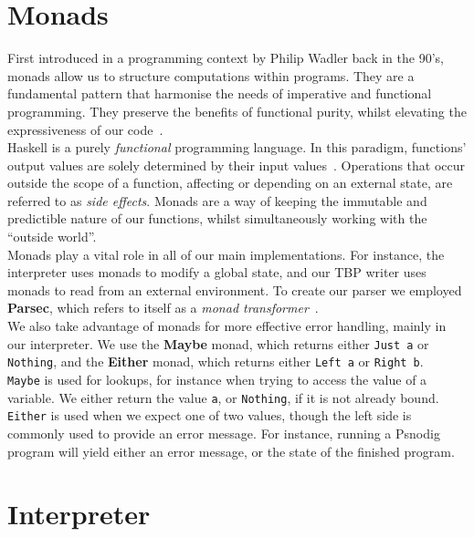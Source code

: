 \section{Monads}

First introduced in a programming context by Philip Wadler back in the 90's, monads allow us to structure computations within programs. They are a fundamental pattern that harmonise the needs of imperative and functional programming. They preserve the benefits of functional purity, whilst elevating the expressiveness of our code~\cite{originOfMonads, leifharaldMaster}. \\

Haskell is a purely \textit{functional} programming language. In this paradigm, functions' output values are solely determined by their input values~\cite{whatIsHaskell}. Operations that occur outside the scope of a function, affecting or depending on an external state, are referred to as \textit{side effects}. Monads are a way of keeping the immutable and predictible nature of our functions, whilst simultaneously working with the ``outside world''. \\

Monads play a vital role in all of our main implementations. For instance, the interpreter uses monads to modify a global state, and our TBP writer uses monads to read from an external environment. To create our parser we employed \textbf{Parsec}, which refers to itself as a \textit{monad transformer}~\cite{parsec}. \\

We also take advantage of monads for more effective error handling, mainly in our interpreter. We use the \textbf{Maybe} monad, which returns either \texttt{Just a} or \texttt{Nothing}, and the \textbf{Either} monad, which returns either \texttt{Left a} or \texttt{Right b}. \\

\texttt{Maybe} is used for lookups, for instance when trying to access the value of a variable. We either return the value \texttt{a}, or \texttt{Nothing}, if it is not already bound. \texttt{Either} is used when we expect one of two values, though the left side is commonly used to provide an error message. For instance, running a Psnodig program will yield either an error message, or the state of the finished program. \\

\section{Interpreter}

